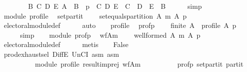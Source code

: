 \begin{isabellebody}
\ \ \ \ \ \ \ \ {\isacharparenleft}{\kern0pt}{\isasymexists}B\ C\ D\ E{\isachardot}{\kern0pt}\ A\ {\isacharequal}{\kern0pt}\ B\ {\isasymand}\ p\ {\isacharequal}{\kern0pt}\ {\isacharparenleft}{\kern0pt}C{\isacharcomma}{\kern0pt}\ D{\isacharcomma}{\kern0pt}\ E{\isacharparenright}{\kern0pt}\ {\isasymand}\ C\ {\isasymunion}\ D\ {\isasymunion}\ E\ {\isacharequal}{\kern0pt}\ B{\isacharparenright}{\kern0pt}{\isachardoublequoteclose}\isanewline
\ \ \ \ \isamarkupfalse%
\ simp\isanewline
\ \ \isamarkupfalse%
\ module\ profile\ \isamarkupfalse%
\ set{\isacharunderscore}{\kern0pt}partit{\isacharcolon}{\kern0pt}\isanewline
\ \ \ \ {\isachardoublequoteopen}set{\isacharunderscore}{\kern0pt}equals{\isacharunderscore}{\kern0pt}partition\ A\ {\isacharparenleft}{\kern0pt}m\ A\ p{\isacharparenright}{\kern0pt}{\isachardoublequoteclose}\isanewline
\ \ \ \ \isamarkupfalse%
\ electoral{\isacharunderscore}{\kern0pt}module{\isacharunderscore}{\kern0pt}def\isanewline
\ \ \ \ \isamarkupfalse%
\ auto\isanewline
\ \ \isamarkupfalse%
\ profile\ \isamarkupfalse%
\ prof{\isacharunderscore}{\kern0pt}p{\isacharcolon}{\kern0pt}\isanewline
\ \ \ \ {\isachardoublequoteopen}finite\ A\ {\isasymand}\ profile\ A\ p{\isachardoublequoteclose}\isanewline
\ \ \ \ \isamarkupfalse%
\ simp\isanewline
\ \ \isamarkupfalse%
\ module\ prof{\isacharunderscore}{\kern0pt}p\ \isamarkupfalse%
\ wf{\isacharunderscore}{\kern0pt}A{\isacharunderscore}{\kern0pt}m{\isacharcolon}{\kern0pt}\isanewline
\ \ \ \ {\isachardoublequoteopen}well{\isacharunderscore}{\kern0pt}formed\ A\ {\isacharparenleft}{\kern0pt}m\ A\ p{\isacharparenright}{\kern0pt}{\isachardoublequoteclose}\isanewline
\ \ \ \ \isamarkupfalse%
\ electoral{\isacharunderscore}{\kern0pt}module{\isacharunderscore}{\kern0pt}def\isanewline
\ \ \ \ \isamarkupfalse%
\ metis\isanewline
\ \ \isamarkupfalse%
\ {\isachardoublequoteopen}False{\isachardoublequoteclose}\isanewline
\ \ \ \ \isamarkupfalse%
\ prod{\isachardot}{\kern0pt}exhaust{\isacharunderscore}{\kern0pt}sel\ DiffE\ UnCI\ asm{}\ asm{}\isanewline
\ \ \ \ \ \ \ \ \ \ module\ profile\ result{\isacharunderscore}{\kern0pt}imp{\isacharunderscore}{\kern0pt}rej\ wf{\isacharunderscore}{\kern0pt}A{\isacharunderscore}{\kern0pt}m\isanewline
\ \ \ \ \ \ \ \ \ \ prof{\isacharunderscore}{\kern0pt}p\ set{\isacharunderscore}{\kern0pt}partit\ partit\isanewline
\ \ \ \ \isamarkupfalse%

\end{isabellebody}
